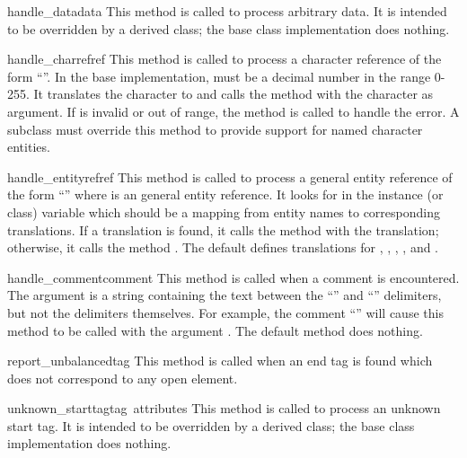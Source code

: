 \begin{funcdesc}{handle_data}{data}
This method is called to process arbitrary data.  It is intended to be
overridden by a derived class; the base class implementation does
nothing.
\end{funcdesc}

\begin{funcdesc}{handle_charref}{ref}
This method is called to process a character reference of the form
``''.  In the base implementation,  must
be a decimal number in the
range 0-255.  It translates the character to \ASCII{} and calls the
method  with the character as argument.  If
 is invalid or out of range, the method
 is called to handle the error.  A
subclass must override this method to provide support for named
character entities.
\end{funcdesc}

\begin{funcdesc}{handle_entityref}{ref}
This method is called to process a general entity reference of the form
``'' where  is an general entity
reference.  It looks for  in the instance (or class)
variable  which should be a mapping from entity names
to corresponding translations.
If a translation is found, it calls the method 
with the translation; otherwise, it calls the method
.  The default 
defines translations for , , ,
, and .
\end{funcdesc}

\begin{funcdesc}{handle_comment}{comment}
This method is called when a comment is encountered.  The
 argument is a string containing the text between the
``\code{<!--}'' and ``\code{-->}'' delimiters, but not the delimiters
themselves.  For example, the comment ``'' will
cause this method to be called with the argument .  The
default method does nothing.
\end{funcdesc}

\begin{funcdesc}{report_unbalanced}{tag}
This method is called when an end tag is found which does not
correspond to any open element.
\end{funcdesc}

\begin{funcdesc}{unknown_starttag}{tag\, attributes}
This method is called to process an unknown start tag.  It is intended
to be overridden by a derived class; the base class implementation
does nothing.
\end{funcdesc}

